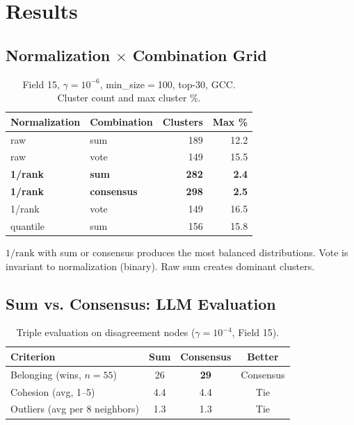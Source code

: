 \documentclass[11pt,a4paper]{article}
\begin{document}
\section{Results}

\subsection{Normalization $\times$ Combination Grid}

\begin{table}[h]
\centering
\caption{Field 15, $\gamma{=}10^{-6}$, min\_size$=$100, top-30, GCC. Cluster count and max cluster \%.}
\begin{tabular}{llrr}
\toprule
Normalization & Combination & Clusters & Max \% \\
\midrule
raw & sum & 189 & 12.2 \\
raw & vote & 149 & 15.5 \\
\textbf{1/rank} & \textbf{sum} & \textbf{282} & \textbf{2.4} \\
\textbf{1/rank} & \textbf{consensus} & \textbf{298} & \textbf{2.5} \\
1/rank & vote & 149 & 16.5 \\
quantile & sum & 156 & 15.8 \\
\bottomrule
\end{tabular}
\end{table}

$1/\text{rank}$ with sum or consensus produces the most balanced distributions. Vote is invariant to normalization (binary). Raw sum creates dominant clusters.

\subsection{Sum vs. Consensus: LLM Evaluation}

\begin{table}[h]
\centering
\caption{Triple evaluation on disagreement nodes ($\gamma{=}10^{-4}$, Field 15).}
\begin{tabular}{lccc}
\toprule
Criterion & Sum & Consensus & Better \\
\midrule
Belonging (wins, $n{=}55$) & 26 & \textbf{29} & Consensus \\
Cohesion (avg, 1--5) & 4.4 & 4.4 & Tie \\
Outliers (avg per 8 neighbors) & 1.3 & 1.3 & Tie \\
\bottomrule
\end{tabular}
\end{table}
\end{document}
